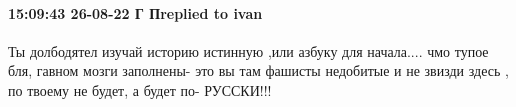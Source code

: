  
 
 
 
 

\paragraph{15:09:43 26-08-22 Г Пreplied to ivan}

Ты долбодятел изучай историю истинную ,или азбуку для начала.... чмо тупое бля,
гавном мозги заполнены- это вы там фашисты недобитые и не звизди здесь , по
твоему не будет, а будет по- РУССКИ!!!
